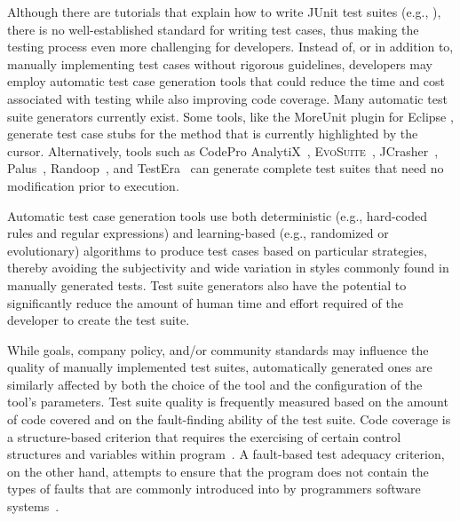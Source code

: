 

Although there are tutorials that explain how to write JUnit test suites (e.g., \cite{vogella2013}), there is no well-established standard for writing test cases, thus making the testing process even more challenging for developers.  Instead of, or in addition to, manually implementing test cases without rigorous guidelines, developers may employ automatic test case generation tools that could reduce the time and cost associated with testing while also improving code coverage.  Many automatic test suite generators currently exist.  Some tools, like the MoreUnit plugin for Eclipse \cite{moreunit}, generate test case stubs for the method that is currently highlighted by the cursor.  Alternatively, tools such as CodePro AnalytiX~\cite{CodePro1}, \textsc{EvoSuite}~\cite{fraser:2011:eat:2025113.2025179}, JCrasher~\cite{csallner2004}, Palus~\cite{zhang:2011:pha:1985793.1986036}, Randoop~\cite{pacheco2007feedback}, and TestEra~\cite{marinov:2001:tnf:872023.872551} can generate complete test suites that need no modification prior to execution.



Automatic test case generation tools use both deterministic (e.g., hard-coded rules and regular expressions) and
learning-based (e.g., randomized or evolutionary) algorithms to produce test cases based on particular strategies,
thereby avoiding the subjectivity and wide variation in styles commonly found in manually generated tests.  Test suite
generators also have the potential to significantly reduce the amount of human time and effort required of the developer
to create the test suite.  


While goals, company policy, and/or community standards may influence the quality of manually implemented test suites, automatically generated ones are similarly affected by both the choice of the tool and the configuration of the tool's parameters.  Test suite quality is frequently measured based on the amount of code covered and on the fault-finding ability of the test suite.  Code coverage is a structure-based criterion that requires the exercising of certain control structures and variables within program~\cite{kapfhammer-testing-handbook}. A fault-based test adequacy criterion, on the other hand, attempts to ensure that the program does not contain the types of faults that are commonly introduced into by programmers software systems~\cite{demillo1978hints, zhu1997software}.  

